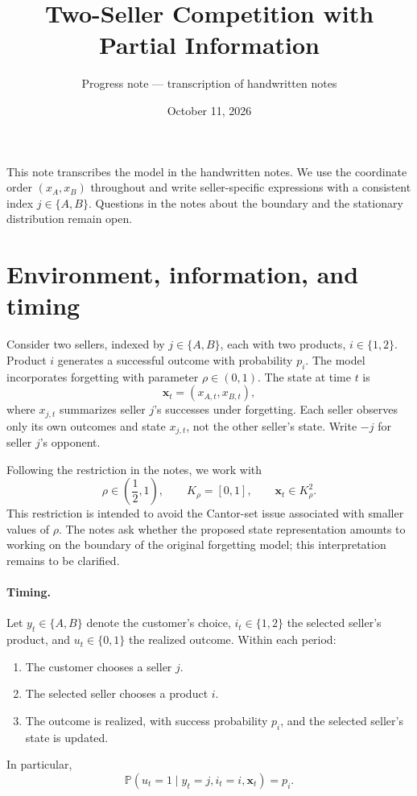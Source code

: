 \documentclass[11pt]{article}
\title{Two-Seller Competition with Partial Information}
\author{Progress note --- transcription of handwritten notes}
\date{October 11, 2026}
\newcommand{\Pb}{\mathbb P}
\newcommand{\K}{K_\rho}
\newcommand{\xx}{\mathbf x}
\begin{document}
\maketitle

This note transcribes the model in the handwritten notes. We use the
coordinate order $(x_A,x_B)$ throughout and write seller-specific
expressions with a consistent index $j\in\{A,B\}$. Questions in the
notes about the boundary and the stationary distribution remain open.

\section{Environment, information, and timing}

Consider two sellers, indexed by $j\in\{A,B\}$, each with two products,
$i\in\{1,2\}$. Product $i$ generates a successful outcome with
probability $p_i$. The model incorporates forgetting with parameter
$\rho\in(0,1)$. The state at time $t$ is
\begin{equation}\label{eq:state}
\xx_t=(x_{A,t},x_{B,t}),
\end{equation}
where $x_{j,t}$ summarizes seller $j$'s successes under forgetting.
Each seller observes only its own outcomes and state $x_{j,t}$, not
the other seller's state. Write $-j$ for seller $j$'s opponent.

Following the restriction in the notes, we work with
\begin{equation}\label{eq:state-space}
\rho\in\left(\frac12,1\right),\qquad
\K=[0,1],\qquad \xx_t\in\K^2.
\end{equation}
This restriction is intended to avoid the Cantor-set issue associated
with smaller values of $\rho$. The notes ask whether the proposed
state representation amounts to working on the boundary of the original
forgetting model; this interpretation remains to be clarified.

\paragraph{Timing.}
Let $y_t\in\{A,B\}$ denote the customer's choice, $i_t\in\{1,2\}$ the
selected seller's product, and $u_t\in\{0,1\}$ the realized outcome.
Within each period:
\begin{enumerate}
\item The customer chooses a seller $j$.
\item The selected seller chooses a product $i$.
\item The outcome is realized, with success probability $p_i$, and
the selected seller's state is updated.
\end{enumerate}
In particular,
\begin{equation}\label{eq:outcome}
\Pb(u_t=1\mid y_t=j,i_t=i,\xx_t)=p_i.
\end{equation}
\end{document}
